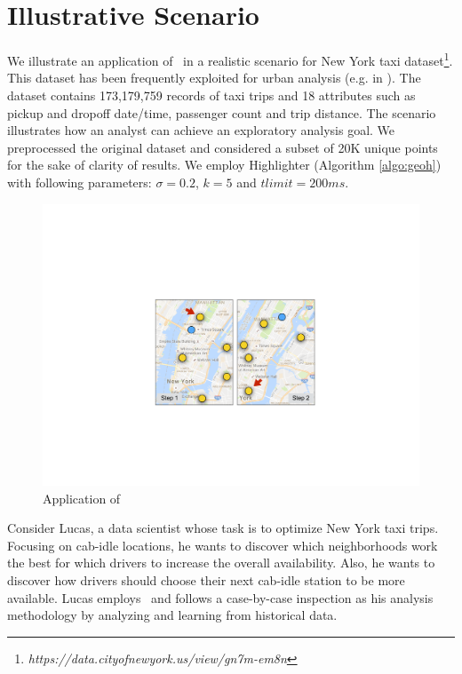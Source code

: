 \section{Illustrative Scenario}\label{sec:scenarios}
We illustrate an application of \framework\ in a realistic scenario for New York taxi dataset\footnote{\it https://data.cityofnewyork.us/view/gn7m-em8n}. This dataset has been frequently exploited for urban analysis
(e.g. in \cite{DBLP:journals/debu/FreireCVZ16}).
The dataset contains 173,179,759 records of taxi trips and 18 attributes such as pickup and dropoff date/time, passenger count and trip distance.
The scenario illustrates how an analyst can achieve an exploratory analysis goal. We preprocessed the original dataset and considered a subset of 20K unique points for the sake of clarity of results. We employ {\sc Highlighter} (Algorithm \ref{algo:geoh}) with following parameters: $\sigma = 0.2$, $k = 5$ and $tlimit = 200ms$.

\begin{figure}
  \centering
  \includegraphics[width=\columnwidth]{figs/scn}
\caption{Application of \framework}
\label{fig:app}
\vspace{-10pt}
\end{figure}


Consider Lucas, a data scientist whose task is to optimize New York taxi trips. Focusing on cab-idle locations, he wants to discover which neighborhoods work the best for which drivers to increase the overall availability. Also, he wants to discover how drivers should choose their next cab-idle station to be more available. Lucas employs \framework\ and follows a case-by-case inspection as his analysis methodology by analyzing and learning from historical data.

